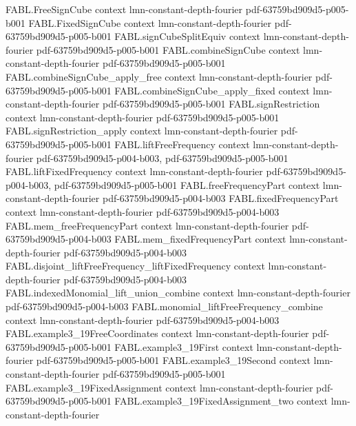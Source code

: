 \begin{theorem}
\proofstep
  {FABL.FreeSignCube}
  {context}
  {lmn-constant-depth-fourier}
  {pdf-63759bd909d5-p005-b001}
\proofstep
  {FABL.FixedSignCube}
  {context}
  {lmn-constant-depth-fourier}
  {pdf-63759bd909d5-p005-b001}
\proofstep
  {FABL.signCubeSplitEquiv}
  {context}
  {lmn-constant-depth-fourier}
  {pdf-63759bd909d5-p005-b001}
\proofstep
  {FABL.combineSignCube}
  {context}
  {lmn-constant-depth-fourier}
  {pdf-63759bd909d5-p005-b001}
\proofstep
  {FABL.combineSignCube_apply_free}
  {context}
  {lmn-constant-depth-fourier}
  {pdf-63759bd909d5-p005-b001}
\proofstep
  {FABL.combineSignCube_apply_fixed}
  {context}
  {lmn-constant-depth-fourier}
  {pdf-63759bd909d5-p005-b001}
\proofstep
  {FABL.signRestriction}
  {context}
  {lmn-constant-depth-fourier}
  {pdf-63759bd909d5-p005-b001}
\proofstep
  {FABL.signRestriction_apply}
  {context}
  {lmn-constant-depth-fourier}
  {pdf-63759bd909d5-p005-b001}
\proofstep
  {FABL.liftFreeFrequency}
  {context}
  {lmn-constant-depth-fourier}
  {pdf-63759bd909d5-p004-b003,
    pdf-63759bd909d5-p005-b001}
\proofstep
  {FABL.liftFixedFrequency}
  {context}
  {lmn-constant-depth-fourier}
  {pdf-63759bd909d5-p004-b003,
    pdf-63759bd909d5-p005-b001}
\proofstep
  {FABL.freeFrequencyPart}
  {context}
  {lmn-constant-depth-fourier}
  {pdf-63759bd909d5-p004-b003}
\proofstep
  {FABL.fixedFrequencyPart}
  {context}
  {lmn-constant-depth-fourier}
  {pdf-63759bd909d5-p004-b003}
\proofstep
  {FABL.mem_freeFrequencyPart}
  {context}
  {lmn-constant-depth-fourier}
  {pdf-63759bd909d5-p004-b003}
\proofstep
  {FABL.mem_fixedFrequencyPart}
  {context}
  {lmn-constant-depth-fourier}
  {pdf-63759bd909d5-p004-b003}
\proofstep
  {FABL.disjoint_liftFreeFrequency_liftFixedFrequency}
  {context}
  {lmn-constant-depth-fourier}
  {pdf-63759bd909d5-p004-b003}
\proofstep
  {FABL.indexedMonomial_lift_union_combine}
  {context}
  {lmn-constant-depth-fourier}
  {pdf-63759bd909d5-p004-b003}
\proofstep
  {FABL.monomial_liftFreeFrequency_combine}
  {context}
  {lmn-constant-depth-fourier}
  {pdf-63759bd909d5-p004-b003}
\proofstep
  {FABL.example3_19FreeCoordinates}
  {context}
  {lmn-constant-depth-fourier}
  {pdf-63759bd909d5-p005-b001}
\proofstep
  {FABL.example3_19First}
  {context}
  {lmn-constant-depth-fourier}
  {pdf-63759bd909d5-p005-b001}
\proofstep
  {FABL.example3_19Second}
  {context}
  {lmn-constant-depth-fourier}
  {pdf-63759bd909d5-p005-b001}
\proofstep
  {FABL.example3_19FixedAssignment}
  {context}
  {lmn-constant-depth-fourier}
  {pdf-63759bd909d5-p005-b001}
\proofstep
  {FABL.example3_19FixedAssignment_two}
  {context}
  {lmn-constant-depth-fourier}

\end{theorem}
